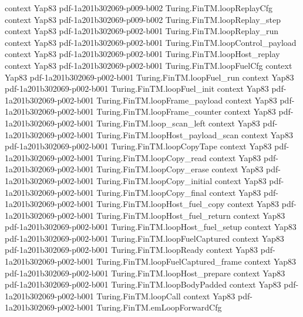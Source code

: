 \begin{theorem}
  {context}
  {Yap83}
  {pdf-1a201b302069-p009-b002}
\proofstep
  {Turing.FinTM.loopReplayCfg}
  {context}
  {Yap83}
  {pdf-1a201b302069-p009-b002}
\proofstep
  {Turing.FinTM.loopReplay_step}
  {context}
  {Yap83}
  {pdf-1a201b302069-p002-b001}
\proofstep
  {Turing.FinTM.loopReplay_run}
  {context}
  {Yap83}
  {pdf-1a201b302069-p002-b001}
\proofstep
  {Turing.FinTM.loopControl_payload}
  {context}
  {Yap83}
  {pdf-1a201b302069-p002-b001}
\proofstep
  {Turing.FinTM.loopHost_replay}
  {context}
  {Yap83}
  {pdf-1a201b302069-p002-b001}
\proofstep
  {Turing.FinTM.loopFuelCfg}
  {context}
  {Yap83}
  {pdf-1a201b302069-p002-b001}
\proofstep
  {Turing.FinTM.loopFuel_run}
  {context}
  {Yap83}
  {pdf-1a201b302069-p002-b001}
\proofstep
  {Turing.FinTM.loopFuel_init}
  {context}
  {Yap83}
  {pdf-1a201b302069-p002-b001}
\proofstep
  {Turing.FinTM.loopFrame_payload}
  {context}
  {Yap83}
  {pdf-1a201b302069-p002-b001}
\proofstep
  {Turing.FinTM.loopFrame_counter}
  {context}
  {Yap83}
  {pdf-1a201b302069-p002-b001}
\proofstep
  {Turing.FinTM.loop_scan_left}
  {context}
  {Yap83}
  {pdf-1a201b302069-p002-b001}
\proofstep
  {Turing.FinTM.loopHost_payload_scan}
  {context}
  {Yap83}
  {pdf-1a201b302069-p002-b001}
\proofstep
  {Turing.FinTM.loopCopyTape}
  {context}
  {Yap83}
  {pdf-1a201b302069-p002-b001}
\proofstep
  {Turing.FinTM.loopCopy_read}
  {context}
  {Yap83}
  {pdf-1a201b302069-p002-b001}
\proofstep
  {Turing.FinTM.loopCopy_erase}
  {context}
  {Yap83}
  {pdf-1a201b302069-p002-b001}
\proofstep
  {Turing.FinTM.loopCopy_initial}
  {context}
  {Yap83}
  {pdf-1a201b302069-p002-b001}
\proofstep
  {Turing.FinTM.loopCopy_final}
  {context}
  {Yap83}
  {pdf-1a201b302069-p002-b001}
\proofstep
  {Turing.FinTM.loopHost_fuel_copy}
  {context}
  {Yap83}
  {pdf-1a201b302069-p002-b001}
\proofstep
  {Turing.FinTM.loopHost_fuel_return}
  {context}
  {Yap83}
  {pdf-1a201b302069-p002-b001}
\proofstep
  {Turing.FinTM.loopHost_fuel_setup}
  {context}
  {Yap83}
  {pdf-1a201b302069-p002-b001}
\proofstep
  {Turing.FinTM.loopFuelCaptured}
  {context}
  {Yap83}
  {pdf-1a201b302069-p002-b001}
\proofstep
  {Turing.FinTM.loopReady}
  {context}
  {Yap83}
  {pdf-1a201b302069-p002-b001}
\proofstep
  {Turing.FinTM.loopFuelCaptured_frame}
  {context}
  {Yap83}
  {pdf-1a201b302069-p002-b001}
\proofstep
  {Turing.FinTM.loopHost_prepare}
  {context}
  {Yap83}
  {pdf-1a201b302069-p002-b001}
\proofstep
  {Turing.FinTM.loopBodyPadded}
  {context}
  {Yap83}
  {pdf-1a201b302069-p002-b001}
\proofstep
  {Turing.FinTM.loopCall}
  {context}
  {Yap83}
  {pdf-1a201b302069-p002-b001}
\proofstep
  {Turing.FinTM.emLoopForwardCfg}

\end{theorem}
